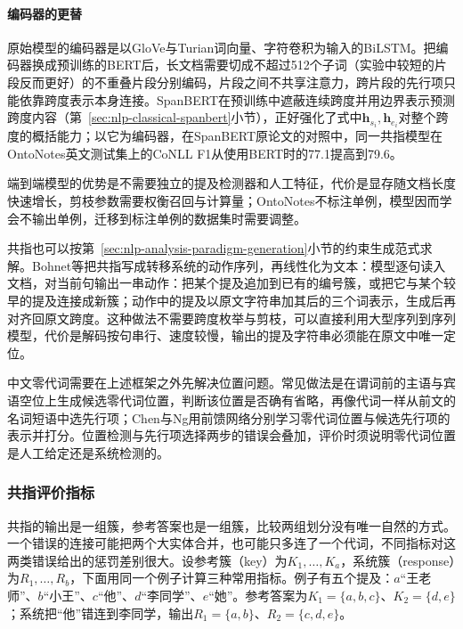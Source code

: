 \paragraph{编码器的更替}
原始模型的编码器是以GloVe与Turian词向量、字符卷积为输入的BiLSTM。把编码器换成预训练的BERT后，长文档需要切成不超过512个子词（实验中较短的片段反而更好）的不重叠片段分别编码，片段之间不共享注意力，跨片段的先行项只能依靠跨度表示本身连接。SpanBERT在预训练中遮蔽连续跨度并用边界表示预测跨度内容（第~\ref{sec:nlp-classical-spanbert}小节），正好强化了式中$\bm h_{s_i},\bm h_{e_i}$对整个跨度的概括能力；以它为编码器，在SpanBERT原论文的对照中，同一共指模型在OntoNotes英文测试集上的CoNLL F1从使用BERT时的77.1提高到79.6。

端到端模型的优势是不需要独立的提及检测器和人工特征，代价是显存随文档长度快速增长，剪枝参数需要权衡召回与计算量；OntoNotes不标注单例，模型因而学会不输出单例，迁移到标注单例的数据集时需要调整。

共指也可以按第~\ref{sec:nlp-analysis-paradigm-generation}小节的约束生成范式求解。Bohnet等把共指写成转移系统的动作序列，再线性化为文本：模型逐句读入文档，对当前句输出一串动作：把某个提及追加到已有的编号簇，或把它与某个较早的提及连接成新簇；动作中的提及以原文字符串加其后的三个词表示，生成后再对齐回原文跨度。这种做法不需要跨度枚举与剪枝，可以直接利用大型序列到序列模型，代价是解码按句串行、速度较慢，输出的提及字符串必须能在原文中唯一定位。

中文零代词需要在上述框架之外先解决位置问题。常见做法是在谓词前的主语与宾语空位上生成候选零代词位置，判断该位置是否确有省略，再像代词一样从前文的名词短语中选先行项；Chen与Ng用前馈网络分别学习零代词位置与候选先行项的表示并打分。位置检测与先行项选择两步的错误会叠加，评价时须说明零代词位置是人工给定还是系统检测的。

\subsubsection{共指评价指标}
\label{sec:nlp-analysis-coreference-metrics}

共指的输出是一组簇，参考答案也是一组簇，比较两组划分没有唯一自然的方式。一个错误的连接可能把两个大实体合并，也可能只多连了一个代词，不同指标对这两类错误给出的惩罚差别很大。设参考簇（key）为$K_1,\ldots,K_a$，系统簇（response）为$R_1,\ldots,R_b$，下面用同一个例子计算三种常用指标。例子有五个提及：$a$“王老师”、$b$“小王”、$c$“他”、$d$“李同学”、$e$“她”。参考答案为$K_1=\{a,b,c\}$、$K_2=\{d,e\}$；系统把“他”错连到李同学，输出$R_1=\{a,b\}$、$R_2=\{c,d,e\}$。

